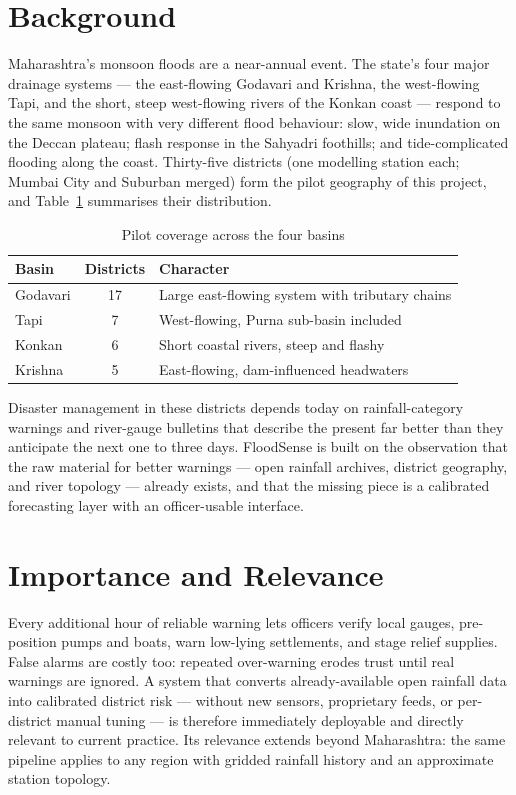 \documentclass[a4paper,12pt]{report}
\begin{document}
\section{Background}
Maharashtra's monsoon floods are a near-annual event. The state's four major drainage systems --- the east-flowing Godavari and Krishna, the west-flowing Tapi, and the short, steep west-flowing rivers of the Konkan coast --- respond to the same monsoon with very different flood behaviour: slow, wide inundation on the Deccan plateau; flash response in the Sahyadri foothills; and tide-complicated flooding along the coast. Thirty-five districts (one modelling station each; Mumbai City and Suburban merged) form the pilot geography of this project, and Table~\ref{tab:basins} summarises their distribution.

\begin{table}[H]
\centering
\renewcommand{\arraystretch}{1.3}
\begin{tabularx}{\textwidth}{|>{\raggedright\arraybackslash}p{3.2cm}|c|X|}
\hline
\textbf{Basin} & \textbf{Districts} & \textbf{Character} \\ \hline
Godavari & 17 & Large east-flowing system with tributary chains \\ \hline
Tapi & 7 & West-flowing, Purna sub-basin included \\ \hline
Konkan & 6 & Short coastal rivers, steep and flashy \\ \hline
Krishna & 5 & East-flowing, dam-influenced headwaters \\ \hline
\end{tabularx}
\caption{Pilot coverage across the four basins}
\label{tab:basins}
\end{table}

Disaster management in these districts depends today on rainfall-category warnings and river-gauge bulletins that describe the present far better than they anticipate the next one to three days. FloodSense is built on the observation that the raw material for better warnings --- open rainfall archives, district geography, and river topology --- already exists, and that the missing piece is a calibrated forecasting layer with an officer-usable interface.

\section{Importance and Relevance}
Every additional hour of reliable warning lets officers verify local gauges, pre-position pumps and boats, warn low-lying settlements, and stage relief supplies. False alarms are costly too: repeated over-warning erodes trust until real warnings are ignored. A system that converts already-available open rainfall data into calibrated district risk --- without new sensors, proprietary feeds, or per-district manual tuning --- is therefore immediately deployable and directly relevant to current practice. Its relevance extends beyond Maharashtra: the same pipeline applies to any region with gridded rainfall history and an approximate station topology.
\end{document}
